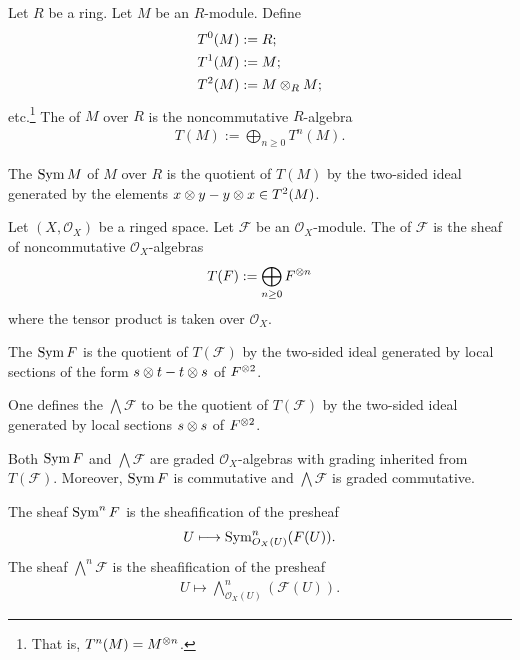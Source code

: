 \documentclass [11 pt, oneside] {article}
\begin{document}
\begin{definition}
	Let $R$ be a ring. Let $M$ be an $R$-module. Define
	\begin{align*}
		T^0(M) &:= R;\\
		T^1(M) &:= M;\\
		T^2(M) &:= M\otimes_RM;
	\end{align*}
	etc.\footnote{That is, $T^n(M) = M^{\otimes n}$.} The  of $M$ over $R$ is the noncommutative $R$-algebra 
	\begin{align*}
		T(M) :=  \bigoplus_{n\ge 0}T^n(M).
	\end{align*}
	
	The  $\operatorname{Sym} M$ of $M$ over $R$ is the quotient of $T(M)$ by the two-sided ideal generated by the elements $x\otimes y - y\otimes x \in T^2(M)$.
\end{definition}

\begin{definition}[ ]\label{}\text{}
Let $(X,\mathscr{O}_X)$ be a ringed space. Let $\mathscr{F}$ be an $\mathscr{O}_X$-module. The  of $\mathscr{F}$ is the sheaf of noncommutative $\mathscr{O}_X$-algebras
\begin{align*}
	T(\relax{F}) := \bigoplus_{n\ge 0} \relax{F}^{\otimes n}
\end{align*}
where the tensor product is taken over $\mathscr{O}_X$. 

The  $\operatorname{Sym} \relax{F}$ is the quotient of $T(\mathscr{F})$ by the two-sided ideal generated by local sections of the form $s\otimes t - t\otimes s$ of $\relax{F}^{\otimes 2}$. 
\end{definition}

\begin{remark}
	One defines the  $\bigwedge  \mathscr{F}$ to be the quotient of $T(\mathscr{F})$ by the two-sided ideal generated by local sections $s\otimes s$ of $\relax{F}^{\otimes 2}$.

	Both $\operatorname{Sym} \relax{F}$ and $\bigwedge \mathscr{F}$ are graded $\mathscr{O}_X$-algebras with grading inherited from $T(\mathscr{F})$. Moreover, $\operatorname{Sym} \relax{F}$ is commutative and $\bigwedge \mathscr{F}$ is graded commutative.
\end{remark}

\begin{remark}
	The sheaf $\operatorname{Sym}^n \relax{F}$ is the sheafification of the presheaf
	\begin{align*}
		U\longmapsto \operatorname{Sym}_{\relax{O}_X(U)}^n  (\relax{F}(U)).
	\end{align*}
	The sheaf $\bigwedge^n \mathscr{F}$ is the sheafification of the presheaf
	\begin{align*}
		U\longmapsto \bigwedge\nolimits^n_{\mathscr{O}_X(U)}  (\mathscr{F}(U)).
	\end{align*}
\end{remark}
\end{document}
